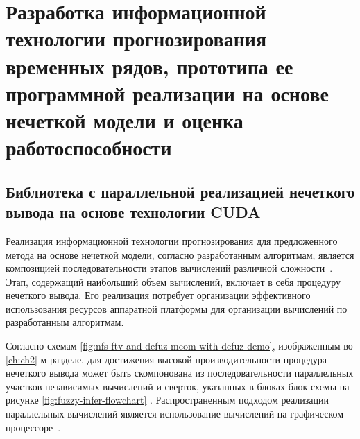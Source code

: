 \chapter{Разработка информационной технологии прогнозирования временных рядов, прототипа ее программной реализации на основе нечеткой модели и оценка работоспособности}\label{ch:ch4}

\section{Библиотека с параллельной реализацией нечеткого вывода на основе технологии CUDA}

Реализация информационной технологии прогнозирования для предложенного метода на основе нечеткой модели, согласно разработанным алгоритмам, является композицией последовательности этапов вычислений различной сложности~\cite{TrofimovISTech2024, SovetovYakovlevModeling2021, RyzhovFuzzySets}. Этап, содержащий наибольший объем вычислений, включает в себя процедуру нечеткого вывода. Его реализация потребует организации эффективного использования ресурсов аппаратной платформы для организации вычислений по разработанным алгоритмам.

Согласно схемам \cref{fig:nfs-ftv-and-defuz-meom-with-defuz-demo}, изображенным во \ref{ch:ch2}-м разделе, для достижения высокой производительности процедура нечеткого вывода может быть скомпонована из последовательности параллельных участков независимых вычислений и сверток, указанных в блоках блок-схемы на рисунке \cref{fig:fuzzy-infer-flowchart} . Распространенным подходом реализации параллельных вычислений является использование вычислений на графическом процессоре~\cite{MalyavkoParallelCUDA2021, BoreskovGPUCUDA2015}.

